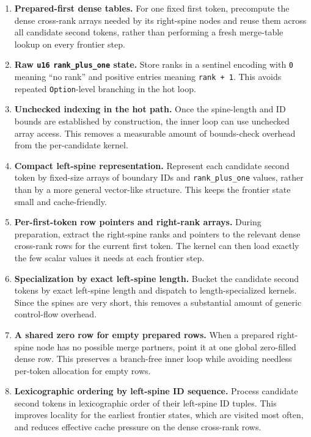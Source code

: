 \begin{enumerate}
    \item \textbf{Prepared-first dense tables.} For one fixed first token, precompute the dense
    cross-rank arrays needed by its right-spine nodes and reuse them across all candidate second
    tokens, rather than performing a fresh merge-table lookup on every frontier step.

    \item \textbf{Raw \texttt{u16} \texttt{rank\_plus\_one} state.} Store ranks in a sentinel
    encoding with \texttt{0} meaning ``no rank'' and positive entries meaning
    \texttt{rank + 1}. This avoids repeated \texttt{Option}-level branching in the hot loop.

    \item \textbf{Unchecked indexing in the hot path.} Once the spine-length and ID bounds are
    established by construction, the inner loop can use unchecked array access. This removes a
    measurable amount of bounds-check overhead from the per-candidate kernel.

    \item \textbf{Compact left-spine representation.} Represent each candidate second token by
    fixed-size arrays of boundary IDs and \texttt{rank\_plus\_one} values, rather than by a more
    general vector-like structure. This keeps the frontier state small and cache-friendly.

    \item \textbf{Per-first-token row pointers and right-rank arrays.} During preparation, extract
    the right-spine ranks and pointers to the relevant dense cross-rank rows for the current first
    token. The kernel can then load exactly the few scalar values it needs at each frontier step.

    \item \textbf{Specialization by exact left-spine length.} Bucket the candidate second tokens by
    exact left-spine length and dispatch to length-specialized kernels. Since the spines are very
    short, this removes a substantial amount of generic control-flow overhead.

    \item \textbf{A shared zero row for empty prepared rows.} When a prepared right-spine node has
    no possible merge partners, point it at one global zero-filled dense row. This preserves a
    branch-free inner loop while avoiding needless per-token allocation for empty rows.

    \item \textbf{Lexicographic ordering by left-spine ID sequence.} Process candidate second
    tokens in lexicographic order of their left-spine ID tuples. This improves locality for the
    earliest frontier states, which are visited most often, and reduces effective cache pressure on
    the dense cross-rank rows.


\end{enumerate}
